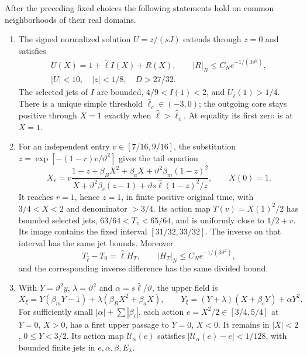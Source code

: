 \begin{proposition}\label{rw:source-maps}
After the preceding fixed choices the following statements hold on
common neighborhoods of their real domains.
\begin{enumerate}[label=(\roman*),leftmargin=*]
\item The signed normalized solution $U=z/(sJ)$ extends through
$z=0$ and satisfies
\begin{equation}\label{rw:source:core-expansion}
 \begin{gathered}
 U(X)=1+\widehat\ell I(X)+R(X),\qquad
 |R|_N\le C_N e^{-1/(3\vartheta^2)},\\
 |U|<10,
 \quad |z|<1/8,\quad D>27/32.
 \end{gathered}
\end{equation}
The selected jets of $I$ are bounded, $4/9<I(1)<2$, and
$U_{\widehat\ell}(1)>1/4$. There is a unique simple threshold
$\widehat\ell_c\in(-3,0)$; the outgoing core stays positive through
$X=1$ exactly when $\widehat\ell>\widehat\ell_c$. At equality its first zero
is at $X=1$.
\item For an independent entry $v\in[7/16,9/16]$, the substitution
$z=\exp[-(1-r)v/\vartheta^2]$ gives the tail equation
\begin{equation}\label{rw:source:tail-equation}
 X_r=v\frac{1-z+\beta_BX^2+\beta_aX+
                    \vartheta^2\beta_m(1-z)^2}
 {X+\vartheta^2\beta_c(z-1)+\vartheta s\widehat\ell(1-z)^2/z},
 \qquad X(0)=1.
\end{equation}
It reaches $r=1$, hence $z=1$, in finite positive original time,
with $3/4<X<2$ and denominator $>3/4$.
Its action map $T(v)=X(1)^2/2$ has bounded selected jets,
$63/64<T_v<65/64$, and is uniformly close to $1/2+v$.
Its image contains the fixed interval $[31/32,33/32]$.
The inverse on that interval has the same jet bounds. Moreover
\begin{equation}\label{rw:source:tail-forcing}
 T_{\widehat\ell}-T_0=\widehat\ell H_T,\qquad
 |H_T|_N\le C_Ne^{-1/(3\vartheta^2)},
\end{equation}
and the corresponding inverse difference has the same divided bound.
\item With $Y=\vartheta^2y$, $\lambda=\vartheta^2$ and
$\alpha=s\widehat\ell/\vartheta$, the upper field is
\begin{equation}\label{rw:source:upper-field}
 X_\xi=Y(\beta_mY-1)+\lambda(\beta_BX^2+\beta_aX),\qquad
 Y_\xi=(Y+\lambda)(X+\beta_cY)+\alpha Y^2.
\end{equation}
For sufficiently small $|\alpha|+\sum|\beta_i|$, each action
$e=X^2/2\in[3/4,5/4]$ at $Y=0$, $X>0$, has a first upper
passage to $Y=0$, $X<0$. It remains in $|X|<2$, $0\le Y<3/2$.
Its action map $\mathcal U_\alpha(e)$ satisfies
$|\mathcal U_\alpha(e)-e|<1/128$, with bounded finite jets in
$e,\alpha,\beta,E_\lambda$.
\end{enumerate}
\end{proposition}
